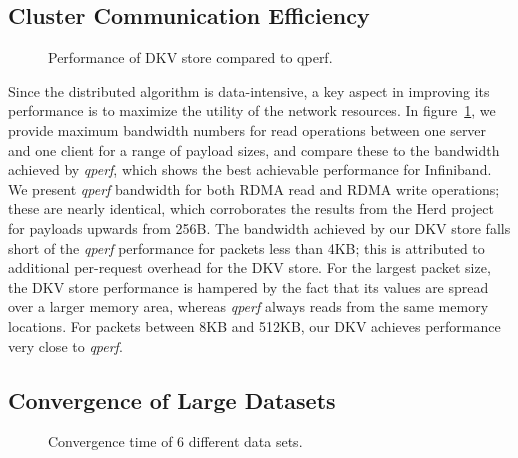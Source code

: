\subsection{Cluster Communication Efficiency}

\begin{figure}[b] %
  \centering
  \caption{Performance of DKV store compared to qperf.}
  \label{fig-qperf}
\end{figure}

Since the distributed algorithm is data-intensive, a key aspect in improving
its performance is to maximize the utility of the network resources.
In figure~\ref{fig-qperf}, we provide maximum bandwidth numbers for
read operations between one server and one client for a range of payload sizes,
and compare these to the bandwidth achieved by \textit{qperf}, which shows
the best achievable performance for Infiniband. We present \textit{qperf}
bandwidth for both RDMA read and RDMA write operations; these are nearly
identical, which corroborates the results from the Herd project for payloads
upwards from 256B. The bandwidth achieved by our DKV store falls short
of the \textit{qperf} performance for packets less than 4KB; this is attributed
to additional per-request overhead for the DKV store. For the largest packet
size, the DKV store performance is hampered by the fact that its values
are spread over a larger memory area, whereas \textit{qperf} always reads
from the same memory locations. For packets between 8KB and 512KB, our DKV
achieves performance very close to \textit{qperf}.

\subsection{Convergence of Large Datasets}
\begin{figure*}[t] %
  \centering
  \caption{Convergence time of 6 different data sets.}
  \label{fig-ppx}
\end{figure*}

